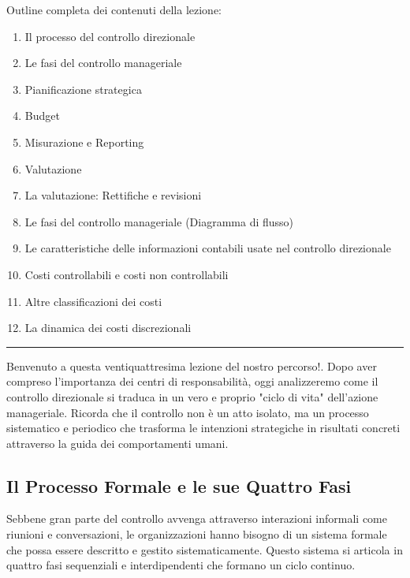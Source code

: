 \documentclass[a4paper,10pt]{article}
\begin{document}
Outline completa dei contenuti della lezione:
{\small
\begin{enumerate}
\item Il processo del controllo direzionale
\item Le fasi del controllo manageriale
\item Pianificazione strategica
\item Budget
\item Misurazione e Reporting
\item Valutazione
\item La valutazione: Rettifiche e revisioni
\item Le fasi del controllo manageriale (Diagramma di flusso)
\item Le caratteristiche delle informazioni contabili usate nel controllo direzionale
\item Costi controllabili e costi non controllabili
\item Altre classificazioni dei costi
\item La dinamica dei costi discrezionali
\end{enumerate}
}
\hrule
\vspace{0.5cm}

Benvenuto a questa ventiquattresima lezione del nostro percorso!. Dopo aver compreso l'importanza dei centri di responsabilità, oggi analizzeremo come il controllo direzionale si traduca in un vero e proprio "ciclo di vita" dell'azione manageriale. Ricorda che il controllo non è un atto isolato, ma un processo sistematico e periodico che trasforma le intenzioni strategiche in risultati concreti attraverso la guida dei comportamenti umani.

\subsection*{Il Processo Formale e le sue Quattro Fasi}

Sebbene gran parte del controllo avvenga attraverso interazioni informali come riunioni e conversazioni, le organizzazioni hanno bisogno di un sistema formale che possa essere descritto e gestito sistematicamente. Questo sistema si articola in quattro fasi sequenziali e interdipendenti che formano un ciclo continuo.
\end{document}
